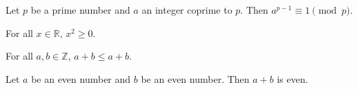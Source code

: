 

\begin{theorem}
Let $p$ be a prime number and $a$ an integer coprime to $p$.
Then $a^{p-1} \equiv 1 \pmod{p}$.
\end{theorem}


\begin{theorem}
For all $x \in \mathbb{R}$, $x^2 \geq 0$.
\end{theorem}


\begin{theorem}
For all $a, b \in \mathbb{Z}$, $a + b \leq a + b$.
\end{theorem}


\begin{theorem}
Let $a$ be an even number and $b$ be an even number.
Then $a + b$ is even.
\end{theorem}


